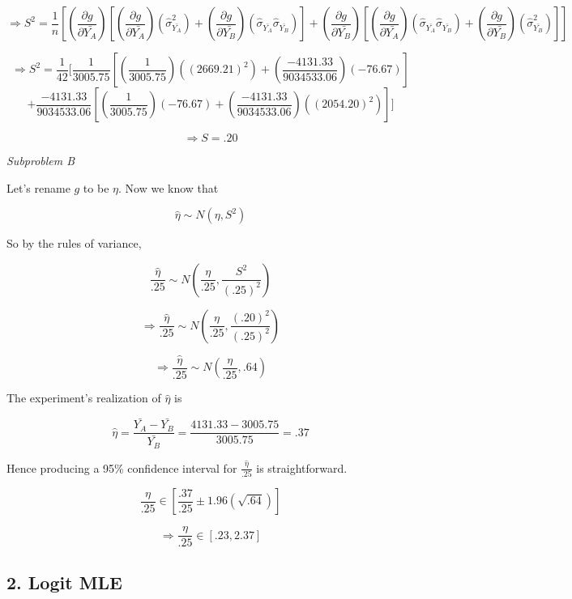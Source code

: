 \documentclass[11pt]{article}
\begin{document}
\[\Rightarrow S^2 = \frac{1}{n}[(\frac{\partial g}{\partial \bar{Y_A}})[(\frac{\partial g}{\partial \bar{Y_A}})(\hat{\sigma}_{\bar{Y_A}}^2)+(\frac{\partial g}{\partial \bar{Y_B}})(\hat{\sigma}_{\bar{Y_A}}\hat{\sigma}_{\bar{Y_B}})] + (\frac{\partial g}{\partial \bar{Y_B}})[(\frac{\partial g}{\partial \bar{Y_A}})(\hat{\sigma}_{\bar{Y_A}}\hat{\sigma}_{\bar{Y_B}})+(\frac{\partial g}{\partial \bar{Y_B}})(\hat{\sigma}_{\bar{Y_B}}^2)]] \]

\[\Rightarrow S^2 = \frac{1}{42}[\frac{1}{3005.75}[(\frac{1}{3005.75})((2669.21)^2)+(\frac{-4131.33}{9034533.06})(-76.67)]\] \[+\frac{-4131.33}{9034533.06}[(\frac{1}{3005.75})(-76.67)+(\frac{-4131.33}{9034533.06})((2054.20)^2)]] \]

\[\Rightarrow S = .20\]

\textit{Subproblem B}

\bigskip Let's rename $g$ to be $\eta$. Now we know that

\[\hat{\eta} \sim N(\eta,S^2) \]

So by the rules of variance,

\[\frac{\hat{\eta}}{.25} \sim N(\frac{\eta}{.25},\frac{S^2}{(.25)^2}) \]

\[\Rightarrow \frac{\hat{\eta}}{.25} \sim N(\frac{\eta}{.25},\frac{(.20)^2}{(.25)^2})\]

\[\Rightarrow \frac{\hat{\eta}}{.25} \sim N(\frac{\eta}{.25},.64)\]

The experiment's realization of $\hat{\eta}$ is

\[\hat{\eta}=\frac{\bar{Y_A}-\bar{Y_B}}{\bar{Y_B}}=\frac{4131.33-3005.75}{3005.75}=.37\]

Hence producing a 95\% confidence interval for $\frac{\hat{\eta}}{.25}$ is straightforward.

\[\frac{\eta}{.25} \in \left[\frac{.37}{.25}\pm1.96(\sqrt{.64})\right] \]

\[\Rightarrow \frac{\eta}{.25} \in \left[.23,2.37\right]\]

\subsection*{2. Logit MLE}
\end{document}
